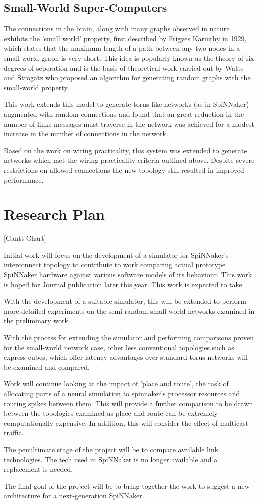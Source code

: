 \subsection{Small-World Super-Computers}

The connections in the brain, along with many graphs observed in nature exhibits
the 'small world' property, first described by Frigyes Karinthy in 1929, which
states that the maximum length of a path between any two nodes in a small-world
graph is very short. This idea is popularly known as the theory of six degrees
of seperation and is the basis of theoretical work carried out by Watts and
Strogatz who proposed an algorithm for generating random graphs with the
small-world property.

This work extends this model to generate torus-like networks (as in SpiNNaker)
augmented with random connections and found that an great reduction in the
number of links messages must traverse in the network was achieved for a modest
increase in the number of connections in the network.

Based on the work on wiring practicality, this system was extended to generate
networks which met the wiring practicality criteria outlined above. Despite
severe restrictions on allowed connections the new topology still resulted in
improved performance.

\section{Research Plan}

[Gantt Chart]

Initial work will focus on the development of a simulator for SpiNNaker's
interconnect topology to contribute to work comparing actual prototype SpiNNaker
hardware against various software models of its behaviour. This work is hoped
for Journal publication later this year. This work is expected to take 

With the development of a suitable simulator, this will be extended to perform
more detailed experiments on the semi-random small-world networks examined in
the preliminary work.

With the process for extending the simulator and performing comparisons proven
for the small-world network case, other less conventional topologies such as
express cubes, which offer latency advantages over standard torus networks will
be examined and compared.

Work will continue looking at the impact of 'place and route', the task of
allocating parts of a neural simulation to spinnaker's processor resources and
routing spikes between them. This will provide a further comparison to be drawn
between the topologies examined as place and route can be extremely
computationally expensive. In addition, this will consider the effect of
multicast traffic.

The penultimate stage of the project will be to compare available link
technologies. The tech used in SpiNNaker is no longer available and a
replacement is needed.

The final goal of the project will be to bring together the work to suggest a
new architecture for a next-generation SpiNNaker.

